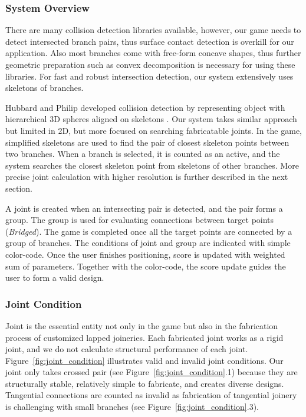\subsubsection*{System Overview}
There are many collision detection libraries available, however, our game needs to detect intersected branch pairs, thus surface contact detection is overkill for our application.
Also most branches come with free-form concave shapes, thus further geometric preparation such as convex decomposition is necessary for using these libraries.
For fast and robust intersection detection, our system extensively uses skeletons of branches.

Hubbard and Philip developed collision detection by representing object with hierarchical 3D spheres aligned on skeletons \cite{Hubbard:1996:APS:231731.231732}.
Our system takes similar approach but limited in 2D, but more focused on searching fabricatable joints.
In the game, simplified skeletons are used to find the pair of closest skeleton points between two branches.
When a branch is selected, it is counted as an active, and the system searches the closest skeleton point from skeletons of other branches.
More precise joint calculation with higher resolution is further described in the next section.

A joint is created when an intersecting pair is detected, and the pair forms a group.
The group is used for evaluating connections between target points (\textit{Bridged}).
The game is completed once all the target points are connected by a group of branches.
The conditions of joint and group are indicated with simple color-code.
Once the user finishes positioning, score is updated with weighted sum of parameters.
Together with the color-code, the score update guides the user to form a valid design.


\subsubsection*{Joint Condition}
Joint is the essential entity not only in the game but also in the fabrication process of customized lapped joineries.
Each fabricated joint works as a rigid joint, and we do not calculate structural performance of each joint.
Figure~\ref{fig:joint_condition} illustrates valid and invalid joint conditions.
Our joint only takes crossed pair (see Figure~\ref{fig:joint_condition}.1) because they are structurally stable, relatively simple to fabricate, and creates diverse designs. 
Tangential connections are counted as invalid as fabrication of tangential joinery is challenging with small branches (see Figure~\ref{fig:joint_condition}.3).

